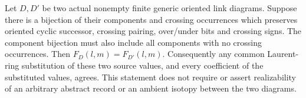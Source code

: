 \begin{lemma}
\label{rp:record-polynomial}
Let $D,D'$ be two actual nonempty finite generic oriented link diagrams.
Suppose there is a bijection of their components and crossing occurrences
which preserves oriented cyclic successor, crossing pairing, over/under
bits and crossing signs. The component bijection must also include all
components with no crossing occurrences. Then $F_D(l,m)=F_{D'}(l,m)$.
Consequently any common Laurent-ring substitution of these two source
values, and every coefficient of the substituted values, agrees.
This statement does not require or assert realizability of an arbitrary
abstract record or an ambient isotopy between the two diagrams.
\end{lemma}
